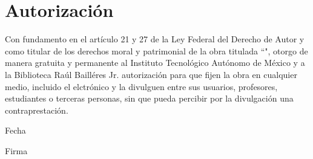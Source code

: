 \chapter*{Autorización}

Con fundamento en el artículo 21 y 27 de la Ley Federal del Derecho de Autor y como titular de los derechos moral y patrimonial de la obra titulada ``\inserttitle", otorgo de manera gratuita y permanente al Instituto Tecnológico Autónomo de México y a la Biblioteca Raúl Bailléres Jr. autorización para que fijen la obra en cualquier medio, incluido el elctrónico y la divulguen entre sus usuarios, profesores, estudiantes o terceras personas, sin que pueda percibir por la divulgación una contraprestación.

\vspace{15 mm}
\begin{center}
  \insertauthor
\end{center}

\vspace{10 mm}
\begin{center}
\hspace{0.5cm} \makebox[3.5 in]{\hrulefill}
\end{center}
\begin{center}
  Fecha
\end{center}

\vspace{10 mm}
\begin{center}
\hspace{0.5cm} \makebox[3.5 in]{\hrulefill}
\end{center}

\begin{center}
  Firma
\end{center}
